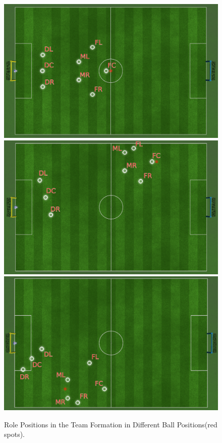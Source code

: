 \begin{figure}[t!]
\centering
  \includegraphics[height=0.3\textheight]{Chapter4/figures/Formation(0,0).pdf}\\
  \includegraphics[height=0.3\textheight]{Chapter4/figures/Formation(5,5).pdf}\\
  \includegraphics[height=0.3\textheight]{Chapter4/figures/Formation(-5,-5).pdf}\\
  \caption{Role Positions in the Team Formation in Different Ball Positions(red spots).} 
  \label{fig:FormationExamples}
\end{figure}

